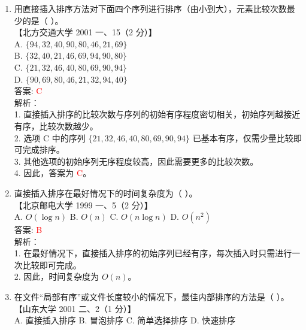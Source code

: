 \documentclass[lang=cn,newtx,10pt,scheme=chinese]{../../../elegantbook}
\begin{document}
\begin{enumerate}
    \item 用直接插入排序方法对下面四个序列进行排序（由小到大），元素比较次数最少的是（ ）。\\
    【北方交通大学 2001 一、15（2 分）】\\  

    A. $\{94, 32, 40, 90, 80, 46, 21, 69\}$ \\  
    B. $\{32, 40, 21, 46, 69, 94, 90, 80\}$ \\  
    C. $\{21, 32, 46, 40, 80, 69, 90, 94\}$ \\  
    D. $\{90, 69, 80, 46, 21, 32, 94, 40\}$ \\  

    答案: \textcolor{red}{C} \\

    解析：\\
    1. 直接插入排序的比较次数与序列的初始有序程度密切相关，初始序列越接近有序，比较次数越少。\\
    2. 选项 C 中的序列 $\{21, 32, 46, 40, 80, 69, 90, 94\}$ 已基本有序，仅需少量比较即可完成排序。\\
    3. 其他选项的初始序列无序程度较高，因此需要更多的比较次数。\\
    4. 因此，答案为 \textcolor{red}{C}。\\
    \item 直接插入排序在最好情况下的时间复杂度为（ ）。\\
    【北京邮电大学 1999 一、5（2 分）】\\  

    A. $O(\log n)$ \quad B. $O(n)$ \quad C. $O(n \log n)$ \quad D. $O(n^2)$ \\

    答案: \textcolor{red}{B} \\

    解析：\\
    1. 在最好情况下，直接插入排序的初始序列已经有序，每次插入时只需进行一次比较即可完成。\\
    2. 因此，时间复杂度为 $O(n)$。\\

\item 在文件“局部有序”或文件长度较小的情况下，最佳内部排序的方法是（ ）。\\
    【山东大学 2001 二、2（1 分）】\\  

    A. 直接插入排序 \quad B. 冒泡排序 \quad C. 简单选择排序 \quad D. 快速排序 \\


\end{enumerate}
\end{document}
